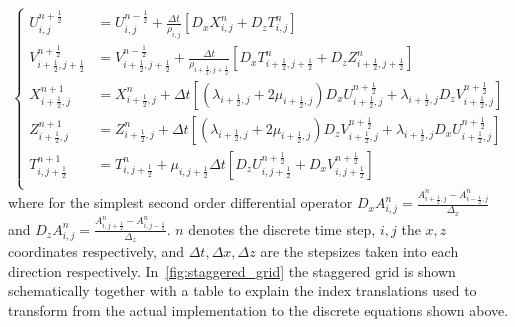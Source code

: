 \documentclass[10pt]{SelfArx} %
\theoremstyle{definition}
\begin{document}
\begin{equation}
\left\{
\begin{aligned}
U_{i,j}^{n+\frac{1}{2}}  &= U_{i,j}^{n-\frac{1}{2}} + \frac{\Delta t}{\rho_{i,j}}\left[ D_xX_{i,j}^n + D_zT^n_{i,j}\right] \\
V_{i+\frac{1}{2},j+\frac{1}{2}}^{n+\frac{1}{2}}  &= V_{i+\frac{1}{2},j+\frac{1}{2}}^{n-\frac{1}{2}} + \frac{\Delta t}{\rho_{i+\frac{1}{2},j+\frac{1}{2}}}\left[ D_xT_{i+\frac{1}{2},j+\frac{1}{2}}^n + D_zZ^n_{i+\frac{1}{2},j+\frac{1}{2}}\right] \\
X_{i+\frac{1}{2},j}^{n+1}  &= X_{i+\frac{1}{2},j}^{n} + \Delta t\left[ \left(\lambda_{i+\frac{1}{2},j} + 2 \mu_{i+\frac{1}{2},j}\right)D_xU_{i+\frac{1}{2},j}^{n+\frac{1}{2}} + \lambda_{i+\frac{1}{2},j} D_zV^{n+\frac{1}{2}}_{i+\frac{1}{2},j}\right] \\
Z_{i+\frac{1}{2},j}^{n+1}  &= Z_{i+\frac{1}{2},j}^{n} + \Delta t\left[ \left(\lambda_{i+\frac{1}{2},j} + 2 \mu_{i+\frac{1}{2},j}\right)D_zV_{i+\frac{1}{2},j}^{n+\frac{1}{2}} + \lambda_{i+\frac{1}{2},j} D_xU^{n+\frac{1}{2}}_{i+\frac{1}{2},j}\right] \\
T_{i,j+\frac{1}{2}}^{n+1}  &= T_{i,j+\frac{1}{2}}^{n} + \mu_{i,j+\frac{1}{2}}\Delta t\left[ D_zU_{i,j+\frac{1}{2}}^{n+\frac{1}{2}} + D_xV^{n+\frac{1}{2}}_{i,j+\frac{1}{2}}\right] \\
\end{aligned}\right.
\end{equation}
where for the simplest second order differential operator $D_x A^n_{i,j} = \frac{A^n_{i+\frac{1}{2},j} - A^n_{i-\frac{1}{2},j}}{\Delta_x}$ and $D_z A^n_{i,j} = \frac{A^n_{i,j+\frac{1}{2}} - A^n_{i,j-\frac{1}{2}}}{\Delta_z}$. $n$ denotes the discrete time step, $i,j$ the $x,z$ coordinates respectively, and $\Delta t, \Delta x, \Delta z$ are the stepsizes taken into each direction respectively.
In~\cref{fig:staggered_grid} the staggered grid is shown schematically together with a table to explain the index translations used to transform from the actual implementation to the discrete equations shown above. 
\end{document}
